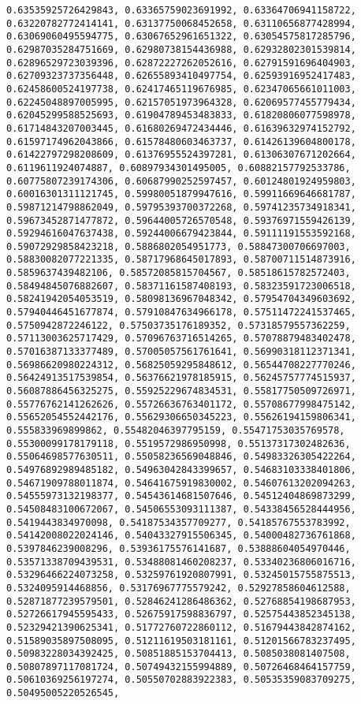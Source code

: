 \documentclass[11pt]{article}
\begin{document}
\begin{Verbatim}[commandchars=\\\{\}]
0.63535925726429843, 0.63365759023691992, 0.63364706941158722, 0.63220782772414141, 0.63137750068452658, 0.63110656877428994, 0.63069060495594775, 0.63067652961651322, 0.63054575817285796, 0.62987035284751669, 0.62980738154436988, 0.62932802301539814, 0.62896529723039396, 0.62872227262052616, 0.62791591696404903, 0.62709323737356448, 0.62655893410497754, 0.62593916952417483, 0.62458600524197738, 0.62417465119676985, 0.62347065661011003, 0.62245048897005995, 0.62157051973964328, 0.62069577455779434, 0.62045299588525693, 0.61904789453483833, 0.61820806077598978, 0.61714843207003445, 0.61680269472434446, 0.61639632974152792, 0.61597174962043866, 0.61578480603463737, 0.61426139604800178, 0.61422797298208609, 0.61376955524397281, 0.61306307671202664, 0.6119611924074887, 0.60897934301495005, 0.60882157792533786, 0.60775807239174306, 0.60687990252597457, 0.60124801924959803, 0.60016301311121745, 0.59980051879947616, 0.59911669646681787, 0.59871214798862049, 0.59795393700372268, 0.59741235734918341, 0.59673452871477872, 0.59644005726570548, 0.59376971559426139, 0.59294616047637438, 0.59244006679423844, 0.59111191553592168, 0.59072929858423218, 0.5886802054951773, 0.58847300706697003, 0.58830082077221335, 0.58717968645017893, 0.58700711514873916, 0.5859637439482106, 0.58572085815704567, 0.58518615782572403, 0.58494845076882607, 0.58371161587408193, 0.58323591723006518, 0.58241942054053519, 0.58098136967048342, 0.57954704349603692, 0.57940446451677874, 0.57910847634966178, 0.57511472241537465, 0.5750942872246122, 0.57503735176189352, 0.57318579557362259, 0.57113003625717429, 0.57096763716514265, 0.57078879483402478, 0.57016387133377489, 0.57005057561761641, 0.56990318112371341, 0.56986620980224312, 0.56825059295848612, 0.56544708227770246, 0.56424913517539854, 0.56376621978185915, 0.56245757774515937, 0.56087886456325275, 0.55925229674834531, 0.55817750509726971, 0.55776762141262626, 0.55726636763401172, 0.55708677998475142, 0.55652054552442176, 0.55629306650345223, 0.55626194159806341, 0.555833969899862, 0.55482046397795159, 0.55471753035769578, 0.55300099178179118, 0.5519572986950998, 0.55137317302482636, 0.55064698577630511, 0.55058236569048846, 0.54983326305422264, 0.54976892989485182, 0.54963042843399657, 0.54683103338401806, 0.54671909788011874, 0.54641675919830002, 0.54607613202094263, 0.54555973132198377, 0.54543614681507646, 0.54512404869873299, 0.54508483100672067, 0.54506553093111387, 0.54338456528444956, 0.5419443834970098, 0.54187534357709277, 0.54185767553783992, 0.54142008022024146, 0.54043327915506345, 0.54000482736761868, 0.5397846239008296, 0.53936175576141687, 0.53888604054970446, 0.53571338709439531, 0.53488081460208237, 0.53340236806016716, 0.53296466224073258, 0.53259761920807991, 0.53245015755875513, 0.5324095914468856, 0.53176967775579242, 0.52927858604612588, 0.52871877239579501, 0.52846241286486362, 0.52768854198687953, 0.52726617945595433, 0.52675917598836797, 0.52575443852345138, 0.52329421390625341, 0.51772760722860112, 0.51679443842874162, 0.51589035897508095, 0.51211619503181161, 0.51201566783237495, 0.50983228034392425, 0.50851885153704413, 0.5085038081407508, 0.50807897117081724, 0.50749432155994889, 0.50726468464157759, 0.50610369256197274, 0.50550702883922383, 0.50535359083709275, 0.50495005220526545, 
\end{Verbatim}
\end{document}
